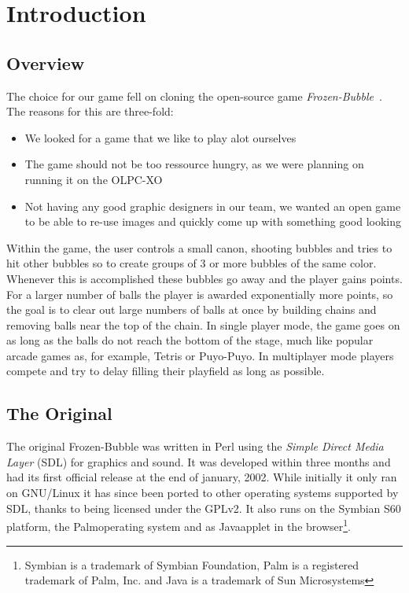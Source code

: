 \section{Introduction}
\subsection{Overview}
%
The choice for our game fell on cloning the open-source game \emph{Frozen-Bubble}~\cite{website:frozenbubble}. The reasons 
for this are three-fold:
%
\begin{itemize}
  \item We looked for a game that we like to play alot ourselves
  \item The game should not be too ressource hungry, as we were planning
    on running it on the OLPC-XO
  \item Not having any good graphic designers in our team, we wanted an
    open game to be able to re-use images and quickly come up with something
    good looking
\end{itemize}
%
Within the game, the user controls a small canon, shooting bubbles and tries to 
hit other bubbles so to create groups of 3 or more bubbles of the same color. 
Whenever this is accomplished these bubbles go away and the player gains points. 
For a larger number of balls the 
player is awarded exponentially more points, so the goal is to clear out large numbers 
of balls at once by building chains and removing balls near the top of the chain.
In single player mode, the game goes on as long as the balls do not reach the bottom 
of the stage, much like popular arcade games as, for example, Tetris or Puyo-Puyo.
In multiplayer mode players compete and try to delay filling their playfield 
as long as possible.
%
\subsection{The Original}
The original Frozen-Bubble was written in Perl using the \emph{Simple Direct Media Layer} (SDL)
for graphics and sound. It was developed within three months and had its first official 
release at the end of january, 2002. While initially it only ran on GNU/Linux it has since
been ported to other operating systems supported by SDL, thanks to being licensed under the GPLv2.
It also runs on the Symbian\trademark
S60 platform, the Palm\registered operating system and as Java\trademark applet in the 
browser\footnote{Symbian is a trademark of Symbian Foundation, Palm is a registered trademark 
of Palm, Inc. and Java is a trademark of Sun Microsystems}.

